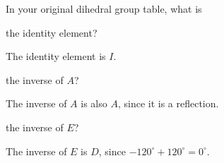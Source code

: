\documentclass[../key.tex]{subfiles}
\begin{document}
\begin{outer_problem}
\item In your original dihedral group table, what is
\end{outer_problem}

\begin{inner_problem}[start=1]
\item the identity element?
\end{inner_problem}

\noindent The identity element is $I$.

\begin{inner_problem}
\item the inverse of $A$?
\end{inner_problem}

\noindent The inverse of $A$ is also $A$, since it is a reflection.

\begin{inner_problem}
\item the inverse of $E$?
\end{inner_problem}

\noindent The inverse of $E$ is $D$, since $-120^\circ+120^\circ = 0^\circ$.
\end{document}
